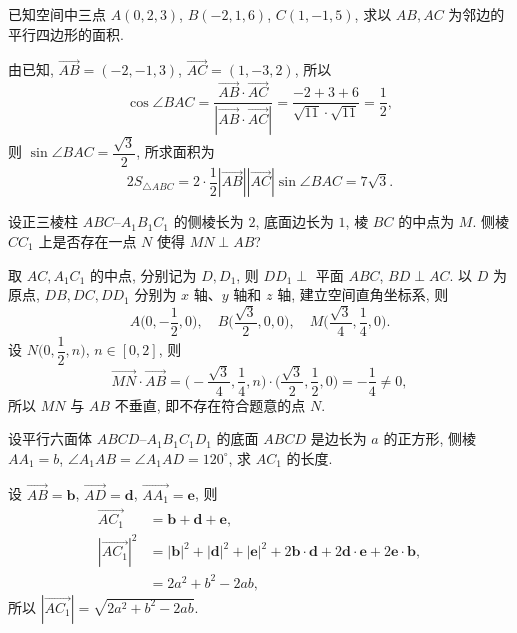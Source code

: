 \begin{exercise}
    已知空间中三点 $A(0,2,3)$, $B(-2,1,6)$, $C(1,-1,5)$, 求以 $AB,AC$ 为邻边的平行四边形的面积.
\end{exercise}
\beginsolution
    由已知, $\overrightarrow{AB}= (-2,-1,3)$, $\overrightarrow{AC}= (1,-3,2)$, 所以
    \[\cos\angle BAC= \frac{\overrightarrow{AB}\cdot \overrightarrow{AC}}{|\overrightarrow{AB}\cdot \overrightarrow{AC}|}
    = \frac{-2+3+6}{\sqrt{11}\cdot\sqrt{11}}= \frac12,\]
    则 $\sin\angle BAC= \dfrac{\sqrt3}2$, 所求面积为
    \[2S_{\triangle ABC}= 2\cdot\frac12 |\overrightarrow{AB}| |\overrightarrow{AC}| \sin\angle BAC
    = 7\sqrt3.\]
\endsolution

\begin{exercise}
    设正三棱柱 $ABC\text{--}A_1B_1C_1$ 的侧棱长为 $2$, 底面边长为 $1$, 棱 $BC$ 的中点为 $M$. 侧棱 $CC_1$ 上是否存在一点 $N$ 使得 $MN\perp AB$?
\end{exercise}
\beginsolution
    取 $AC, A_1C_1$ 的中点, 分别记为 $D,D_1$, 则 $DD_1\perp$ 平面 $ABC$, $BD\perp AC$. 以 $D$ 为原点, $DB, DC, DD_1$ 分别为 $x$ 轴、$y$ 轴和 $z$ 轴, 建立空间直角坐标系, 则
    \[A\biggl(0, -\frac12, 0\biggr),\quad 
        B\biggl(\frac{\sqrt3}2, 0, 0\biggr),\quad
        M\biggl(\frac{\sqrt3}4, \frac14, 0\biggr).\]
    设 $N\biggl(0,\dfrac12,n\biggr)$, $n\in[0,2]$, 则
    \[\overrightarrow{MN}\cdot \overrightarrow{AB}
    = \biggl(-\frac{\sqrt3}4, \frac14, n\biggr)
        \cdot \biggl(\frac{\sqrt3}2, \frac12, 0\biggr)
    = -\frac14\neq 0,\]
    所以 $MN$ 与 $AB$ 不垂直, 即不存在符合题意的点 $N$.
\endsolution

\begin{exercise}
    设平行六面体 $ABCD\text{--}A_1B_1C_1D_1$ 的底面 $ABCD$ 是边长为 $a$ 的正方形, 侧棱 $AA_1= b$, $\angle A_1AB= \angle A_1AD= 120^\circ$, 求 $AC_1$ 的长度.
\end{exercise}
\beginsolution
    设 $\overrightarrow{AB}= \bm{b}$, $\overrightarrow{AD}= \bm{d}$, $\overrightarrow{AA_1}= \bm{e}$, 则
    \[\begin{aligned}
        \overrightarrow{AC_1}&= \bm{b}+\bm{d}+\bm{e},\\
        |\overrightarrow{AC_1}|^2
        &= |\bm{b}|^2+ |\bm{d}|^2+ |\bm{e}|^2+ 2\bm{b}\cdot\bm{d}
            + 2\bm{d}\cdot\bm{e}+ 2\bm{e}\cdot\bm{b},\\
        &= 2a^2+ b^2- 2ab,
    \end{aligned}\]
    所以 $|\overrightarrow{AC_1}|= \sqrt{2a^2+ b^2- 2ab}$.
\endsolution

